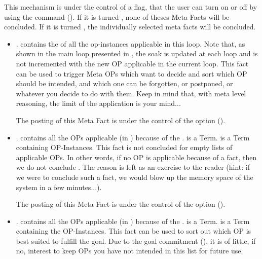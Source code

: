 This mechanism is under the control of a flag, that the user can turn on or off
by using the command  (). If it is turned , none of theses Meta Facts will be
concluded. If it is turned , the individually selected meta facts will
be concluded.

\begin{itemize}

\item
{}. 
contains the  of all the op-instances applicable in this loop.
Note that, as shown in the main loop presented in , the soak is updated at each loop and is not incremented with
the new OP applicable in the current loop. This fact can be used to
trigger Meta OPs which want to decide and sort which OP should be
intended, and which one can be forgotten, or postponed, or whatever you
decide to do with them. Keep in mind that, with meta level reasoning, the
limit of the application is your mind...

The posting of this Meta Fact is under the control of the 
option ().

\item
{}.
 contains all the OPs applicable (in
) because of the .   is
a  Term.  is a
 Term containing OP-Instances. This fact is not
concluded for empty lists of applicable OPs. In other words, if no OP is
applicable because of a fact, then we do not conclude
. The reason is left as an
exercise to the reader (hint: if we were to conclude such a fact, we would
blow up the memory space of the system in a few minutes...).

The posting of this Meta Fact is under the control of the 
option ().

\item {}.
 contains all the OPs applicable (in
) because of the .  is a
 Term.  is a 
Term containing the OP-Instances. This fact can be used to sort out which
OP is best suited to fulfill the goal. Due to the goal commitment
(), it is of little, if no, interest to keep
OPs you have not intended in this list for future use.


\end{itemize}
